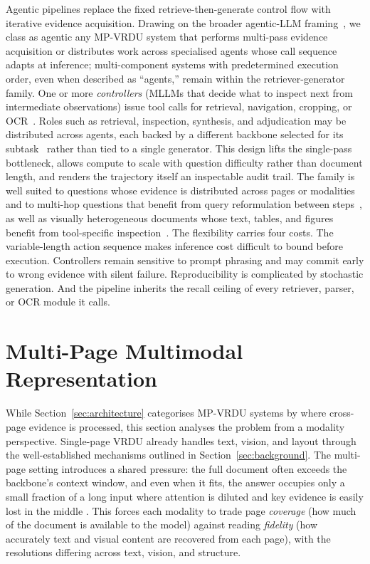 \documentclass[11pt]{article}
\begin{document}
Agentic pipelines replace the fixed retrieve-then-generate control flow with iterative evidence acquisition. Drawing on the broader agentic-LLM framing~\cite{plaat2025agentic,wang2024survey}, we class as agentic any MP-VRDU system that performs multi-pass evidence acquisition or distributes work across specialised agents whose call sequence adapts at inference; multi-component systems with predetermined execution order, even when described as ``agents,'' remain within the retriever-generator family. One or more \emph{controllers} (MLLMs that decide what to inspect next from intermediate observations) issue tool calls for retrieval, navigation, cropping, or OCR~\cite{zheng2026docv,sun2025docagent}. Roles such as retrieval, inspection, synthesis, and adjudication may be distributed across agents, each backed by a different backbone selected for its subtask~\cite{han2025mdocagent} rather than tied to a single generator. This design lifts the single-pass bottleneck, allows compute to scale with question difficulty rather than document length, and renders the trajectory itself an inspectable audit trail. The family is well suited to questions whose evidence is distributed across pages or modalities and to multi-hop questions that benefit from query reformulation between steps~\cite{wang2025vidorag,sun2025docagent}, as well as visually heterogeneous documents whose text, tables, and figures benefit from tool-specific inspection~\cite{han2025mdocagent,zhu2025doclens}. The flexibility carries four costs. The variable-length action sequence makes inference cost difficult to bound before execution. Controllers remain sensitive to prompt phrasing and may commit early to wrong evidence with silent failure. Reproducibility is complicated by stochastic generation. And the pipeline inherits the recall ceiling of every retriever, parser, or OCR module it calls.

\section{Multi-Page Multimodal Representation}
\label{sec:modality}

While Section~\ref{sec:architecture} categorises MP-VRDU systems by where cross-page evidence is processed, this section analyses the problem from a modality perspective. Single-page VRDU already handles text, vision, and layout through the well-established mechanisms outlined in Section~\ref{sec:background}. The multi-page setting introduces a shared pressure: the full document often exceeds the backbone's context window, and even when it fits, the answer occupies only a small fraction of a long input where attention is diluted and key evidence is easily lost in the middle \cite{liu2024lost}. This forces each modality to trade page \emph{coverage} (how much of the document is available to the model) against reading \emph{fidelity} (how accurately text and visual content are recovered from each page), with the resolutions differing across text, vision, and structure.
\end{document}
